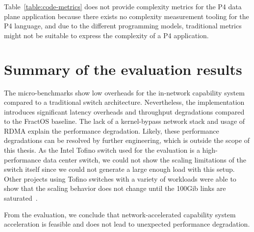 Table~\ref{table:code-metrics} does not provide complexity metrics for the P4 data plane application because there exists no complexity measurement tooling for the P4 language, and due to the different programming models, traditional metrics might not be suitable to express the complexity of a P4 application.


\section{Summary of the evaluation results}

The micro-benchmarks show low overheads for the in-network capability system compared to a traditional switch architecture. Nevertheless, the implementation introduces significant latency overheads and throughput degradations compared to the FractOS baseline. The lack of a kernel-bypass network stack and usage of \ac{RDMA} explain the performance degradation. Likely, these performance degradations can be resolved by further engineering, which is outside the scope of this thesis. As the Intel Tofino switch used for the evaluation is a high-performance data center switch, we could not show the scaling limitations of the switch itself since we could not generate a large enough load with this setup. Other projects using Tofino switches with a variety of workloads were able to show that the scaling behavior does not change until the 100Gib links are saturated~\cite{khashabSwitchVMMultiTenancyInNetwork2023a, jinNetCacheBalancingKeyValue2017, }.

From the evaluation, we conclude that network-accelerated capability system acceleration is feasible and does not lead to unexpected performance degradation.
